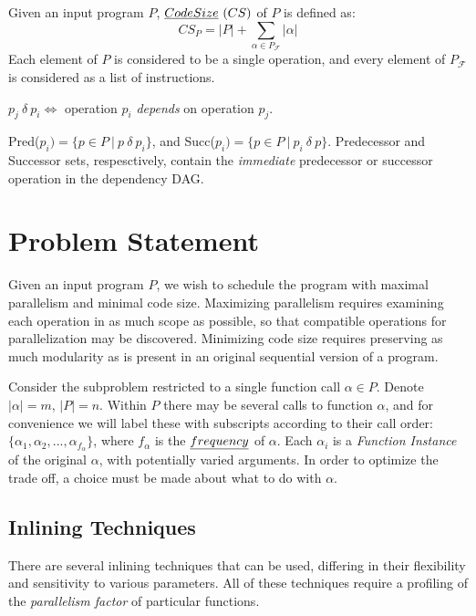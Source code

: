 \documentclass[12pt,twoside]{article}
\begin{document}
\begin{definition} Given an input program $P$, $\emph{Code Size} \ (CS)$ of $P$ is defined as:
	\begin{equation}
		CS_P = |P| + \sum_{\alpha \in P_{\mathcal{F}}} |\alpha|
	\end{equation}
	Each element of $P$ is considered to be a single operation, and every element of $P_{\mathcal{F}}$ is considered as a list of instructions. 
\end{definition}

\begin{definition} $p_j\ \delta\ p_i \iff $ operation $p_i$ \emph{depends} on operation $p_j$.
\end{definition}

\begin{definition} Pred($p_i) = \{p \in P\ |\ p\ \delta\ p_i\}$, and Succ($p_i) = \{p \in P\ |\ p_i\ \delta\ p\}$. Predecessor and Successor sets, respesctively, contain the \emph{immediate} predecessor or successor operation in the dependency DAG.
\end{definition}

\section{Problem Statement}
Given an input program $P$, we wish to schedule the program with maximal parallelism and minimal code size. Maximizing parallelism requires examining each operation in as much scope as possible, so that compatible operations for parallelization may be discovered. Minimizing code size requires preserving as much modularity as is present in an original sequential version of a program. 

Consider the subproblem restricted to a single function call $\alpha \in P$. Denote $|\alpha| = m$, $|P| = n$. Within $P$ there may be several calls to function $\alpha$, and for convenience we will label these with subscripts according to their call order: $\{\alpha_1, \alpha_2, ... , \alpha_{f_{\alpha}}\}$, where $f_{\alpha}$ is the $\emph{frequency}$ of $\alpha$. Each $\alpha_i$ is a \emph{Function Instance} of the original $\alpha$, with potentially varied arguments. In order to optimize the trade off, a choice must be made about what to do with $\alpha$.

\subsection{Inlining Techniques}
There are several inlining techniques that can be used, differing in their flexibility and sensitivity to various parameters. All of these techniques require a profiling of the \emph{parallelism factor} of particular functions. 
\end{document}
